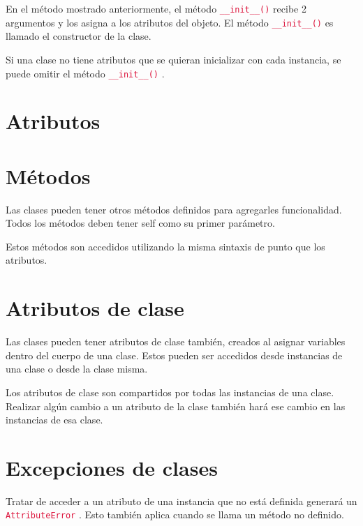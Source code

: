 \documentclass{report}
\newcommand{\ttt}[1]{
  \textcolor{Crimson}{\texttt{#1}}
}
\begin{document}
En el método mostrado anteriormente, el método \ttt{\_\_init\_\_()} recibe 2 argumentos y los asigna a los atributos del objeto. El método \ttt{\_\_init\_\_()} es llamado el constructor de la clase.\smallskip

Si una clase no tiene atributos que se quieran inicializar con cada instancia, se puede omitir el método \ttt{\_\_init\_\_()}.



\section{Atributos}

\section{Métodos}

Las clases pueden tener otros métodos definidos para agregarles funcionalidad. Todos los métodos deben tener self como su primer parámetro.\smallskip

Estos métodos son accedidos utilizando la misma sintaxis de punto que los atributos.


\section{Atributos de clase}

Las clases pueden tener atributos de clase también, creados al asignar variables dentro del cuerpo de una clase. Estos pueden ser accedidos desde instancias de una clase o desde la clase misma.


Los atributos de clase son compartidos por todas las instancias de una clase. Realizar algún cambio a un atributo de la clase también hará ese cambio en las instancias de esa clase.


\section{Excepciones de clases}

Tratar de acceder a un atributo de una instancia que no está definida generará un \ttt{AttributeError}. Esto también aplica cuando se llama un método no definido.
\end{document}
